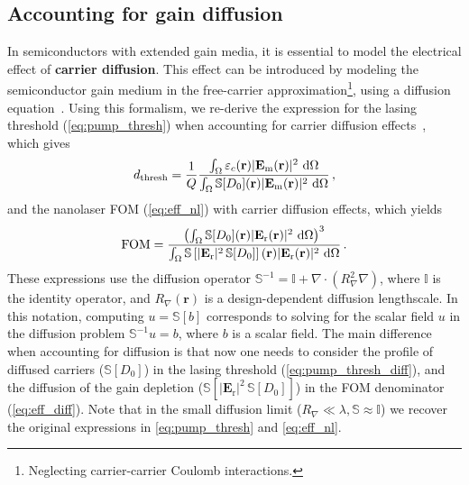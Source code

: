 \subsection*{Accounting for gain diffusion}

In semiconductors with extended gain media, it is essential to model the electrical effect of \textbf{carrier diffusion}. This effect can be introduced by modeling the semiconductor gain medium in the free-carrier approximation\footnote{Neglecting carrier-carrier Coulomb interactions.}, using a diffusion 
equation~\cite{csalt}. Using this formalism, we re-derive the expression for the lasing threshold (\eqref{eq:pump_thresh}) when accounting for carrier diffusion effects~\cite{ownpub4}, which gives
\begin{equation}\label{eq:pump_thresh_diff}
 d_\text{thresh} = \frac{1}{Q} \frac{\int_{\Omega} \varepsilon_c(\mathbf{r})|\mathbf{E}_{\text{m}}(\mathbf{r})|^2\, \mathop{}\!\text{d} \Omega}{\int_{\Omega} \mathbb{S} [D_0] (\mathbf{r}) |\mathbf{E}_{\text{m}}(\mathbf{r})|^2\, \mathop{}\!\text{d} \Omega}\,,
\end{equation}
and the nanolaser FOM (\eqref{eq:eff_nl}) with carrier diffusion effects, which yields
\begin{equation}\label{eq:eff_diff}
 \text{FOM} =  \frac{\left(\int_{\Omega} \mathbb{S} [D_0](\mathbf{r}) |\mathbf{E}_{\text{r}}(\mathbf{r})|^2 \, \mathop{}\!\text{d} \Omega\right)^3} {\int_{\Omega} \mathbb{S}\left[ |\mathbf{E}_{\text{r}}|^2\, \mathbb{S} [D_0] \right] (\mathbf{r})|\mathbf{E}_{\text{r}}(\mathbf{r})|^2 \, \mathop{}\!\text{d} \Omega}\,.
\end{equation}
These expressions use the diffusion operator $\mathbb{S}^{-1}= \mathbb{I}+\nabla \cdot (R_\nabla^2 \nabla)$, where $\mathbb{I}$ is the identity operator, and $R_\nabla (\mathbf{r})$ is a design-dependent diffusion lengthscale.
In this notation, computing $u = \mathbb{S}[b]$ corresponds to solving for the scalar field $u$ in the diffusion problem $\mathbb{S}^{-1}u=b$, where $b$ is a scalar field. 
The main difference when accounting for diffusion is that now one needs to consider the profile of diffused carriers ($\mathbb{S} [D_0]$) in the lasing threshold (\eqref{eq:pump_thresh_diff}), and the diffusion of the gain depletion ($\mathbb{S}[ |\mathbf{E}_{\text{r}}|^2\, \mathbb{S} [D_0]]$)
in the FOM denominator (\eqref{eq:eff_diff}). Note that in the small diffusion limit ($R_\nabla \ll \lambda, \mathbb{S} \approx \mathbb{I}$)
we recover the original expressions in \eqref{eq:pump_thresh} and \eqref{eq:eff_nl}.

